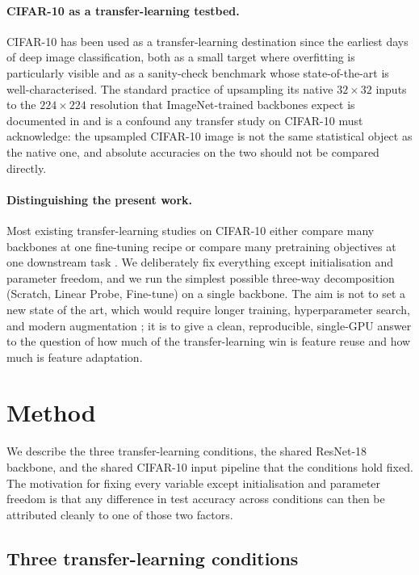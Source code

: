 \documentclass[11pt,twocolumn]{article}
\begin{document}
\paragraph{CIFAR-10 as a transfer-learning testbed.}
CIFAR-10 \cite{krizhevsky2009learning} has been used as a
transfer-learning destination since the earliest days of deep image
classification, both as a small target where overfitting is
particularly visible and as a sanity-check benchmark whose
state-of-the-art is well-characterised. The standard practice of
upsampling its native $32{\times}32$ inputs to the $224{\times}224$
resolution that ImageNet-trained backbones expect is documented in
\citet{kornblith2019better} and is a confound any transfer study on
CIFAR-10 must acknowledge: the upsampled CIFAR-10 image is not the
same statistical object as the native one, and absolute accuracies on
the two should not be compared directly.

\paragraph{Distinguishing the present work.}
Most existing transfer-learning studies on CIFAR-10 either compare
many backbones at one fine-tuning recipe \cite{kornblith2019better}
or compare many pretraining objectives at one downstream task
\cite{ericsson2021how}. We deliberately fix everything except
initialisation and parameter freedom, and we run the simplest
possible three-way decomposition (Scratch, Linear Probe, Fine-tune)
on a single backbone. The aim is not to set a new state of the art,
which would require longer training, hyperparameter search, and
modern augmentation \cite{cubuk2020randaugment}; it is to give a
clean, reproducible, single-GPU answer to the question of how much of
the transfer-learning win is feature reuse and how much is feature
adaptation.


\section{Method}
\label{sec:method}

We describe the three transfer-learning conditions, the shared
ResNet-18 backbone, and the shared CIFAR-10 input pipeline that the
conditions hold fixed. The motivation for fixing every variable
except initialisation and parameter freedom is that any difference in
test accuracy across conditions can then be attributed cleanly to one
of those two factors.

\subsection{Three transfer-learning conditions}
\end{document}
